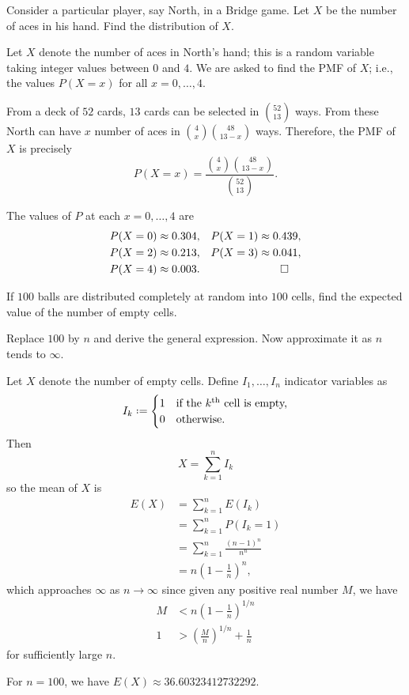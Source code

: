\begin{problem}[Handout 1, \# 16]
  Consider a particular player, say North, in a Bridge game. Let \(X\) be
  the number of aces in his hand. Find the distribution of \(X\).
\end{problem}
\begin{solution*}
  Let \(X\) denote the number of aces in North's hand; this is a random
  variable taking integer values between \(0\) and \(4\). We are asked to
  find the PMF of \(X\); i.e., the values \(P(X=x)\) for all
  \(x=0,\dotsc,4\).

  From a deck of \(52\) cards, \(13\) cards can be selected in
  \(\binom{52}{13}\) ways. From these North can have \(x\) number of aces
  in \(\binom{4}{x}\binom{48}{13-x}\) ways. Therefore, the PMF of \(X\) is
  precisely
  \[
    P(X=x)=\frac{\binom{4}{x}\binom{48}{13-x}}{\binom{52}{13}}.
  \]

  The values of \(P\) at each \(x=0,\dotsc,4\) are
  \begin{align*}
    P(X=0)&\approx 0.304,
    &P(X=1)&\approx 0.439,\\
    P(X=2)&\approx 0.213,
    &P(X=3)&\approx 0.041,\\
    P(X=4)&\approx 0.003.&&\qedhere
  \end{align*}
\end{solution*}

\begin{problem}[Handout 1, \# 20]
  If \(100\) balls are distributed completely at random into \(100\) cells,
  find the expected value of the number of empty cells.

  \noindent Replace \(100\) by \(n\) and derive the general expression. Now
  approximate it as \(n\) tends to \(\infty\).
\end{problem}
\begin{solution*}
  Let \(X\) denote the number of empty cells. Define \(I_1,\dotsc,I_n\)
  indicator variables as
  \[
    I_k\defeq
    \begin{cases}
      1&\text{if the \(k\)\textsup{th} cell is empty,}\\
      0&\text{otherwise.}
    \end{cases}
  \]
  Then
  \[
    X=\sum_{k=1}^n I_k
  \]
  so the mean of \(X\) is
  \begin{align*}
    E(X)
    &=\sum_{k=1}^n E(I_k)\\
    &=\sum_{k=1}^n P(I_k=1)\\
    &=\sum_{k=1}^n\frac{(n-1)^n}{n^n}\\
    &=n\left(1-\frac{1}{n}\right)^n,
  \end{align*}
  which approaches \(\infty\) as \(n\to\infty\) since given any positive
  real number \(M\), we have
  \begin{align*}
    M&<n\left(1-\frac{1}{n}\right)^{1/n}\\
    1&>\left(\frac{M}{n}\right)^{1/n}+\frac{1}{n}
  \end{align*}
  for sufficiently large \(n\).

  For \(n=100\), we have \(E(X)\approx\num{36.60323412732292}\).
\end{solution*}

